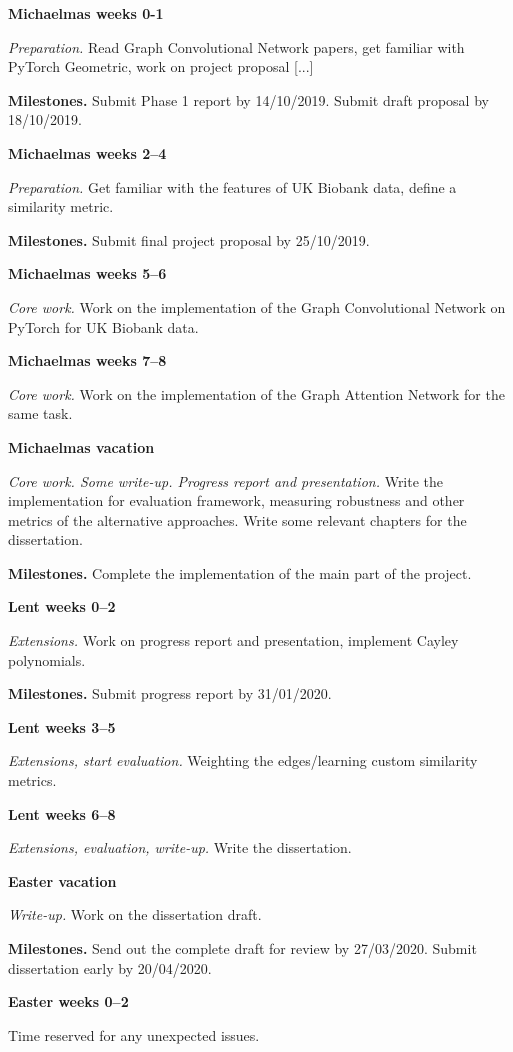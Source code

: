 \documentclass[12pt,a4paper,twoside]{article}
\begin{document}
\textbf{Michaelmas weeks 0-1}

\textit{Preparation.} Read Graph Convolutional Network papers, get familiar with PyTorch Geometric, work on project proposal [...]

\textbf{Milestones.} Submit Phase 1 report by 14/10/2019. Submit draft proposal by 18/10/2019.

\textbf{Michaelmas weeks 2–4}

\textit{Preparation.} Get familiar with the features of UK Biobank data, define a similarity metric.

\textbf{Milestones.} Submit final project proposal by 25/10/2019.

\textbf{Michaelmas weeks 5–6}

\textit{Core work.} Work on the implementation of the Graph Convolutional Network on PyTorch for UK Biobank data.

\textbf{Michaelmas weeks 7–8} 

\textit{Core work.} Work on the implementation of the Graph Attention Network for the same task.

\textbf{Michaelmas vacation}

\textit{Core work. Some write-up. Progress report and presentation.}  Write the implementation for evaluation framework, measuring robustness and other metrics of the alternative approaches. Write some relevant chapters for the dissertation.

\textbf{Milestones.} Complete the implementation of the main part of the project.

\textbf{Lent weeks 0–2}

\textit{Extensions.} Work on progress report and presentation, implement Cayley polynomials.
 
\textbf{Milestones.} Submit progress report by 31/01/2020.


\textbf{Lent weeks 3–5}

\textit{Extensions, start evaluation.} Weighting the edges/learning custom similarity metrics.

\textbf{Lent weeks 6–8}

\textit{Extensions, evaluation, write-up.} Write the dissertation.

\textbf{Easter vacation}

\textit{Write-up.} Work on the dissertation draft.

\textbf{Milestones.} Send out the complete draft for review by 27/03/2020. Submit dissertation early by 20/04/2020.

\textbf{Easter weeks 0–2}

 Time reserved for any unexpected issues.



\end{document}
